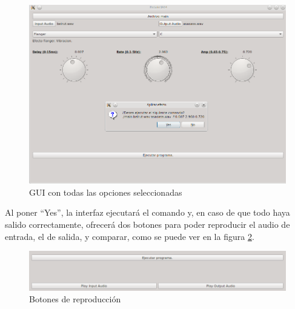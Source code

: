 \documentclass[a4paper,spanish,12pt]{article}
\begin{document}
\begin{figure}[H]
    \centering
    \includegraphics[scale=0.68]{imagenes/gui-complete.png}
    \caption{GUI con todas las opciones seleccionadas}
    \label{fig:gui-complete}
\end{figure}

\vspace{\baselineskip}

Al poner ``Yes'', la interfaz ejecutará el comando y, en caso de que todo haya salido correctamente, ofrecerá dos botones para poder reproducir el audio de entrada, el de salida, y comparar, como se puede ver en la figura \ref{fig:gui-play-buttons}.

\begin{figure}[H]
    \centering
    \includegraphics[scale=0.68]{imagenes/gui-play-buttons.png}
    \caption{Botones de reproducción}
    \label{fig:gui-play-buttons}
\end{figure}
\end{document}
